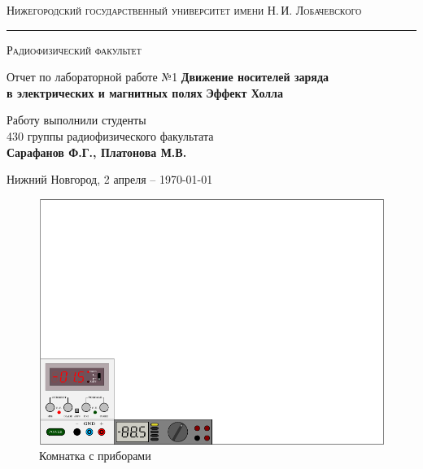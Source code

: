\documentclass[a4paper,14pt]{extarticle}
\def\labauthors{Сарафанов Ф.Г., Платонова М.В.}
\def\labnumber{1}
\begin{document}
\begin{titlepage}
\begin{center}
{\small\textsc{Нижегородский государственный университет имени Н.\,И. Лобачевского}}
\vskip 2pt \hrule \vskip 3pt
{\small\textsc{Радиофизический факультет}}

\vfill


{{\large Отчет по лабораторной работе №\labnumber}\vskip 12pt {\LARGE \bfseries Движение носителей заряда\\[0.2em]  в электрических и магнитных полях}\vskip 12pt {\Huge \bfseries Эффект Холла}}

	
\vspace{2cm}
{\large Работу выполнили студенты \\[-0.25em] 430 группы радиофизического факультата \\[0.5em] {\Large \bfseries \labauthors}}



\end{center}

\vfill
	
	
	
\begin{center}
	{Нижний Новгород, 2 апреля -- \today}
\end{center}

\end{titlepage}
\tableofcontents
\newpage

\begin{figure}[h!]
	\centering
	\includegraphics[width=\linewidth]{ris/3b.pdf}
	\caption{Комнатка с приборами}
	\label{fig:figure1}
\end{figure}
\end{document}
